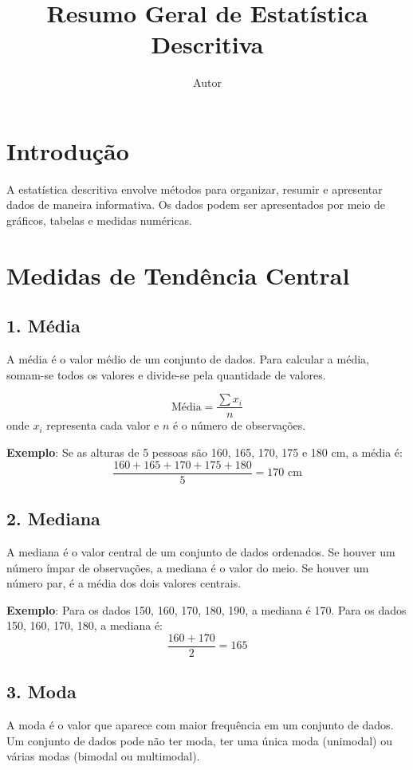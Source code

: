 \documentclass{article}
\title{Resumo Geral de Estatística Descritiva}
\author{Autor}
\date{}
\begin{document}
\maketitle

\section*{Introdução}
A estatística descritiva envolve métodos para organizar, resumir e apresentar dados de maneira informativa. Os dados podem ser apresentados por meio de gráficos, tabelas e medidas numéricas.

\section*{Medidas de Tendência Central}

\subsection*{1. Média}
A média é o valor médio de um conjunto de dados. Para calcular a média, somam-se todos os valores e divide-se pela quantidade de valores.

\begin{equation}
\text{Média} = \frac{\sum x_i}{n}
\end{equation}
onde \(x_i\) representa cada valor e \(n\) é o número de observações.

\textbf{Exemplo}: Se as alturas de 5 pessoas são 160, 165, 170, 175 e 180 cm, a média é:
\[
\frac{160 + 165 + 170 + 175 + 180}{5} = 170 \text{ cm}
\]

\subsection*{2. Mediana}
A mediana é o valor central de um conjunto de dados ordenados. Se houver um número ímpar de observações, a mediana é o valor do meio. Se houver um número par, é a média dos dois valores centrais.

\textbf{Exemplo}: Para os dados 150, 160, 170, 180, 190, a mediana é 170. Para os dados 150, 160, 170, 180, a mediana é:
\[
\frac{160 + 170}{2} = 165
\]

\subsection*{3. Moda}
A moda é o valor que aparece com maior frequência em um conjunto de dados. Um conjunto de dados pode não ter moda, ter uma única moda (unimodal) ou várias modas (bimodal ou multimodal).
\end{document}
